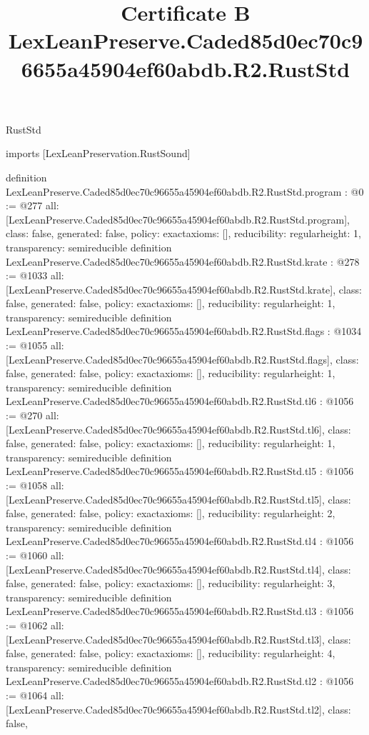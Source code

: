 \begin{lexlean}{RustStd}
\title{Certificate B LexLeanPreserve.Caded85d0ec70c96655a45904ef60abdb.R2.RustStd}
\begin{coremodule}
imports [LexLeanPreservation.RustSound]

definition LexLeanPreserve.Caded85d0ec70c96655a45904ef60abdb.R2.RustStd.program : @0 := @277 {
  all: [LexLeanPreserve.Caded85d0ec70c96655a45904ef60abdb.R2.RustStd.program],
  class: false,
  generated: false,
  policy: exact{axioms: []},
  reducibility: regular{height: 1},
  transparency: semireducible
}
definition LexLeanPreserve.Caded85d0ec70c96655a45904ef60abdb.R2.RustStd.krate : @278 := @1033 {
  all: [LexLeanPreserve.Caded85d0ec70c96655a45904ef60abdb.R2.RustStd.krate],
  class: false,
  generated: false,
  policy: exact{axioms: []},
  reducibility: regular{height: 1},
  transparency: semireducible
}
definition LexLeanPreserve.Caded85d0ec70c96655a45904ef60abdb.R2.RustStd.flags : @1034 := @1055 {
  all: [LexLeanPreserve.Caded85d0ec70c96655a45904ef60abdb.R2.RustStd.flags],
  class: false,
  generated: false,
  policy: exact{axioms: []},
  reducibility: regular{height: 1},
  transparency: semireducible
}
definition LexLeanPreserve.Caded85d0ec70c96655a45904ef60abdb.R2.RustStd.tl6 : @1056 := @270 {
  all: [LexLeanPreserve.Caded85d0ec70c96655a45904ef60abdb.R2.RustStd.tl6],
  class: false,
  generated: false,
  policy: exact{axioms: []},
  reducibility: regular{height: 1},
  transparency: semireducible
}
definition LexLeanPreserve.Caded85d0ec70c96655a45904ef60abdb.R2.RustStd.tl5 : @1056 := @1058 {
  all: [LexLeanPreserve.Caded85d0ec70c96655a45904ef60abdb.R2.RustStd.tl5],
  class: false,
  generated: false,
  policy: exact{axioms: []},
  reducibility: regular{height: 2},
  transparency: semireducible
}
definition LexLeanPreserve.Caded85d0ec70c96655a45904ef60abdb.R2.RustStd.tl4 : @1056 := @1060 {
  all: [LexLeanPreserve.Caded85d0ec70c96655a45904ef60abdb.R2.RustStd.tl4],
  class: false,
  generated: false,
  policy: exact{axioms: []},
  reducibility: regular{height: 3},
  transparency: semireducible
}
definition LexLeanPreserve.Caded85d0ec70c96655a45904ef60abdb.R2.RustStd.tl3 : @1056 := @1062 {
  all: [LexLeanPreserve.Caded85d0ec70c96655a45904ef60abdb.R2.RustStd.tl3],
  class: false,
  generated: false,
  policy: exact{axioms: []},
  reducibility: regular{height: 4},
  transparency: semireducible
}
definition LexLeanPreserve.Caded85d0ec70c96655a45904ef60abdb.R2.RustStd.tl2 : @1056 := @1064 {
  all: [LexLeanPreserve.Caded85d0ec70c96655a45904ef60abdb.R2.RustStd.tl2],
  class: false,
}
\end{coremodule}
\end{lexlean}
